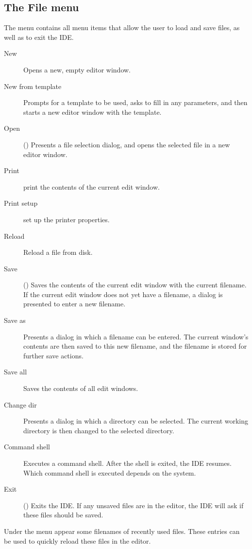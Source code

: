 \subsection{The File menu}
\label{se:menufile}
The  menu contains all menu items that allow the user 
to load and save files, as well as to exit the IDE.
\begin{description}
\item[New] Opens a new, empty editor window.
\item[New from template] Prompts for a template to be used, asks to fill in
any parameters, and then starts a new editor window with the template.
\item[Open] () Presents a file selection dialog, and opens
the selected file in a new editor window.
\item[Print] print the contents of the current edit window.
\item[Print setup] set up the printer properties.
\item[Reload] Reload a file from disk.
\item[Save] () Saves the contents of the current edit window
with the current filename. If the current edit window does not yet have
a filename, a dialog is presented to enter a new filename.
\item[Save as] Presents a dialog in which a filename can be entered. The
current window's contents are then saved to this new filename, and the
filename is stored for further save actions.
\item[Save all] Saves the contents of all edit windows.

\item[Change dir] Presents a dialog in which a directory can be selected.
The current working directory is then changed to the selected directory.
\item[Command shell] Executes a command shell. After the shell is exited, the
IDE resumes. Which command shell is executed depends on the system.
\item[Exit] () Exits the IDE. If any unsaved files are
in the editor, the IDE will ask if these files should be saved.
\end{description}
Under the  menu appear some filenames of recently used files.
These entries can be used to quickly reload these files in the editor.

%
%
